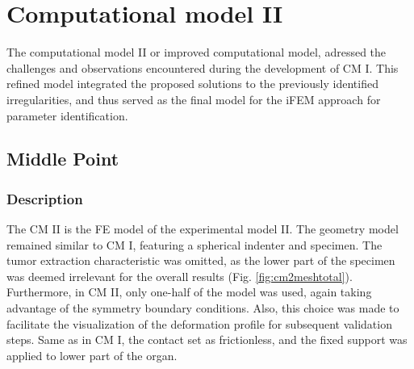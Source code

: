 \section{Computational model II}
The computational model II or improved computational model, adressed the challenges and observations 
encountered during the  development of CM I. This refined model integrated the proposed
solutions to the previously identified irregularities, and thus served as the final model for the 
iFEM approach for parameter identification. 

\subsection{Middle Point}
\label{subsection:mpcmII}
\subsubsection*{Description}
The CM II is the FE model of the experimental model II. The geometry model remained similar to CM I,
featuring a spherical indenter and specimen. The tumor extraction characteristic was omitted, as the 
lower part of the specimen was deemed irrelevant for the overall results (Fig. \ref{fig:cm2meshtotal}). Furthermore, in CM II, only 
one-half of the model was used, again taking advantage of the symmetry boundary conditions. Also,
this choice was made to facilitate the visualization of the deformation profile for subsequent validation 
steps. Same as in CM I, the contact set as frictionless, and the fixed support was applied to lower part of the organ.\\

